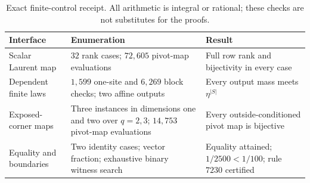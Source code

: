 \begin{table}[t]
  \centering
  \small
  \setlength{\tabcolsep}{4pt}
  \renewcommand{\arraystretch}{1.11}
  \caption{Exact finite-control receipt.  All arithmetic is integral or
  rational; these checks are not substitutes for the proofs.}
  \label{tab:control-receipt}
  \begin{tabularx}{\textwidth}{@{}
    >{\RaggedRight\arraybackslash}p{34mm}
    >{\RaggedRight\arraybackslash}X
    >{\RaggedRight\arraybackslash}p{35mm}@{}}
    \toprule
    Interface & Enumeration & Result \\
    \midrule
    Scalar Laurent map
      & $32$ rank cases; $72{,}605$ pivot-map evaluations
      & Full row rank and bijectivity in every case \\
    Dependent finite laws
      & $1{,}599$ one-site and $6{,}269$ block checks; two affine outputs
      & Every output mass meets $\eta^{|S|}$ \\
    Exposed-corner maps
      & Three instances in dimensions one and two over $q=2,3$;
        $14{,}753$ pivot-map evaluations
      & Every outside-conditioned pivot map is bijective \\
    Equality and boundaries
      & Two identity cases; vector fraction; exhaustive binary witness search
      & Equality attained; $1/2500<1/100$; rule $7230$ certified \\
    \bottomrule
  \end{tabularx}
\end{table}

